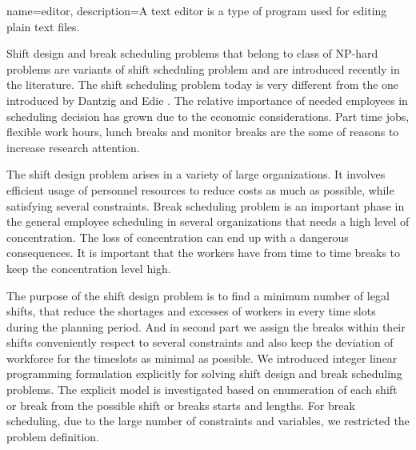 %
%
%
%



{
  name={editor},
  description={A text editor is a type of program used for editing plain text files.}
}


Shift design and break scheduling problems that belong to class of NP-hard problems are variants of shift scheduling problem and are introduced recently in the literature. The shift scheduling problem today is very different from the one introduced by Dantzig \cite{li:1954:dantzig} and Edie \cite{li:1954:edie}. The relative importance of needed employees in scheduling decision has grown due to the economic considerations. Part time jobs, flexible work hours, lunch breaks and monitor breaks are the some of reasons to increase research attention.  

The shift design problem arises in a variety of large organizations. It involves efficient usage of personnel resources to reduce costs  as much as possible, while satisfying several constraints. Break scheduling problem is an important phase in the general employee scheduling in several organizations that needs a high level of concentration. The loss of concentration can end up with a dangerous consequences. It is important that the workers have from time to time breaks to keep the concentration level high. 

The purpose of the shift design problem is to find a minimum number of legal shifts, that reduce the shortages and excesses of workers in every time slots during the planning period. And in second part we assign the breaks within their shifts conveniently respect to several constraints and also keep the deviation of workforce for the timeslots as minimal as possible. We introduced integer linear programming formulation explicitly for solving shift design and break scheduling problems. The explicit model is investigated based on enumeration of each shift or break from the possible shift or breaks starts and  lengths. For break scheduling, due to the large number of constraints and variables, we restricted the problem definition. 

